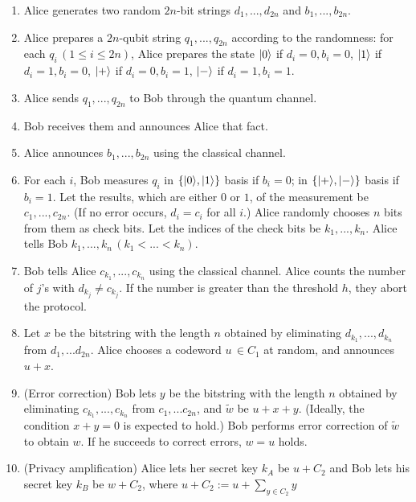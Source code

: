 \begin{enumerate}
 \item Alice generates two random $2n$-bit strings
       $d_1,...,d_{2n}$ and $b_1,...,b_{2n}$.
 \item Alice prepares a $2n$-qubit string $q_1,...,q_{2n}$
       according to the randomness:
       for each $q_i\,(1 \leq i \leq 2n)$, 
       Alice prepares the state $|0\rangle$ if $d_i=0, b_i=0$,
       $|1\rangle$ if $d_i=1, b_i=0$, $|+\rangle$ if $d_i=0,
       b_i=1$, $|-\rangle$ if $d_i=1, b_i=1$.
 \item Alice sends $q_1, ..., q_{2n}$ to Bob through the quantum channel.
 \item Bob receives them and announces Alice
       that fact.
 \item Alice announces $b_1, ..., b_{2n}$ using the classical channel.
 \item For each $i$, Bob measures $q_i$ in $\{|0\rangle,|1\rangle\}$
       basis if $b_i=0$; in $\{|+\rangle,|-\rangle\}$ basis
       if $b_i=1$. Let the results, which
       are either $0$ or $1$, of the measurement be
       $c_1,...,c_{2n}$. (If no error occurs,
       $d_i = c_i$ for all $i$.)
       Alice randomly chooses $n$ bits from them as
       check bits. Let the indices of the 
       check bits be $k_1,...,k_n$. Alice tells Bob
       $k_1,...,k_n \, (k_1 < ... < k_n)$.
 \item Bob tells Alice $c_{k_1},...,c_{k_n}$
       using the classical channel. Alice counts the
       number of $j$'s with $d_{k_j} \neq c_{k_j}$.
       If the number is greater than the threshold $h$, 
       they abort the protocol. 
 \item Let $x$ be the bitstring with the length $n$ obtained by
       eliminating
       $d_{k_1},...,d_{k_n}$ from $d_1,...d_{2n}$.
       Alice chooses a codeword $u$\,$\in C_1$ at random,
       and announces $u + x$.
 \item (Error correction) 
       Bob lets $y$ be the bitstring with the length $n$
       obtained by eliminating
       $c_{k_1},...,c_{k_n}$ from $c_1,...c_{2n}$, and
       $\tilde w$ be $u + x + y$.
       (Ideally, the condition $x + y = 0$ is expected to hold.)
       Bob performs error correction of $\tilde w$ to obtain $w$.
       If he succeeds to
       correct errors, $w = u$ holds.
 \item (Privacy amplification)
       Alice lets her secret key $k_A$ be $u + C_2$ and
       Bob lets his secret key $k_B$ be $w + C_2$, where
       $u + C_2 := u + \sum_{y \in C_2} y$
\end{enumerate}

